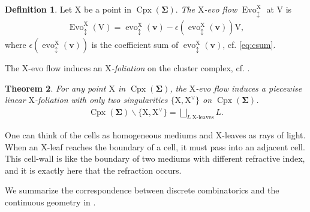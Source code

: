 \documentclass[11pt,reqno]{amsart}
\theoremstyle{plain}
\newtheorem{theorem}{Theorem}[section]
\theoremstyle{definition}
\newtheorem{definition}[theorem]{Definition}
\numberwithin{equation}{section}
\newcommand\<{\langle}
\renewcommand\>{\rangle}
\renewcommand{\setminus}{\smallsetminus}
\newcommand{\on}[1]{\operatorname{#1}}
\def\CCx{\on{Cpx}}   %
\def\vv{\mathbf{v}}
\def\sink{X}
\newcommand{\flowdu}[1]{\on{evo}_{\updownarrow}^{#1}}
\newcommand{\flowDU}[1]{\on{Evo}_{\updownarrow}^{#1}}
\newcommand{\ccpt}[1]{\mathrm{#1}}%
\def\xevo{\ccpt{X}}%
\def\seeds{\mathbf{\Sigma}}
\newcommand{\DT}[1]{#1^{\vee}}
\def\Xevo{\DT{\ccpt{X}}}
\def\csum{\epsilon}
\begin{document}
\begin{definition}
Let $\xevo$ be a point in $\CCx(\seeds)$. \emph{The $\xevo$-evo flow} $\flowDU{\xevo}$ at $\ccpt{V}$ is
\begin{gather}\label{eq:intro-EVO}
    \flowDU{\xevo}(\ccpt{V})=
    \flowdu{\xevo}(\vv)-\csum(\flowdu{\xevo}(\vv))\ccpt{V},
\end{gather}
where $\csum(\flowdu{\xevo}(\vv))$ is the coefficient sum of $\flowdu{\xevo}(\vv)$, cf. \eqref{eq:csum}.
\end{definition}

The $\xevo$-evo flow induces an \emph{$\xevo$-foliation} on the cluster complex, cf. .
\begin{theorem}
For any point $\xevo$ in $\CCx(\seeds)$, the $\xevo$-evo flow induces a piecewise linear \emph{$\xevo$-foliation} with only two singularities $\{\xevo,\Xevo\}$ on $\CCx(\seeds)$.
\begin{gather}
    \CCx(\seeds)\setminus\{\xevo,\Xevo\}=\bigsqcup_{L~\text{$\xevo$-leaves}} L.
\end{gather}
\end{theorem}
One can think of the cells as homogeneous mediums and $\xevo$-leaves as rays of light.
When an X-leaf reaches the boundary of a cell, it must pass into an adjacent cell. 
This cell-wall is like the boundary of two mediums with different refractive index, and it is exactly here that the refraction occurs. 

We summarize the correspondence between discrete combinatorics and the continuous geometry in .
\end{document}
